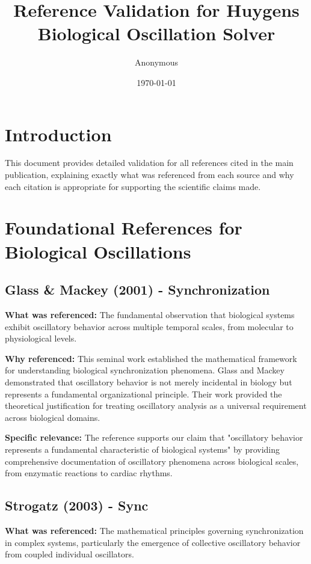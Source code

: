 \documentclass{article}
\title{Reference Validation for Huygens Biological Oscillation Solver}
\author{Anonymous}
\date{\today}
\begin{document}
\maketitle

\section{Introduction}

This document provides detailed validation for all references cited in the main publication, explaining exactly what was referenced from each source and why each citation is appropriate for supporting the scientific claims made.

\section{Foundational References for Biological Oscillations}

\subsection{Glass \& Mackey (2001) - Synchronization}

\textbf{What was referenced:} The fundamental observation that biological systems exhibit oscillatory behavior across multiple temporal scales, from molecular to physiological levels.

\textbf{Why referenced:} This seminal work established the mathematical framework for understanding biological synchronization phenomena. Glass and Mackey demonstrated that oscillatory behavior is not merely incidental in biology but represents a fundamental organizational principle. Their work provided the theoretical justification for treating oscillatory analysis as a universal requirement across biological domains.

\textbf{Specific relevance:} The reference supports our claim that "oscillatory behavior represents a fundamental characteristic of biological systems" by providing comprehensive documentation of oscillatory phenomena across biological scales, from enzymatic reactions to cardiac rhythms.

\subsection{Strogatz (2003) - Sync}

\textbf{What was referenced:} The mathematical principles governing synchronization in complex systems, particularly the emergence of collective oscillatory behavior from coupled individual oscillators.
\end{document}

